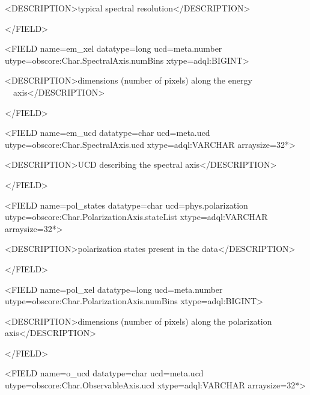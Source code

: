 \documentclass[11pt,a4paper]{ivoa}
\begin{document}
{\textless}DESCRIPTION{\textgreater}typical spectral resolution{\textless}/DESCRIPTION{\textgreater}

{\textless}/FIELD{\textgreater}

{\textless}FIELD name={\textquotedbl}em\_xel{\textquotedbl} datatype={\textquotedbl}long{\textquotedbl}
ucd={\textquotedbl}meta.number{\textquotedbl} utype={\textquotedbl}obscore:Char.SpectralAxis.numBins{\textquotedbl}
xtype={\textquotedbl}adql:BIGINT{\textquotedbl}{\textgreater}

 {\textless}DESCRIPTION{\textgreater}dimensions (number of pixels) along the energy
\ \ axis{\textless}/DESCRIPTION{\textgreater}

{\textless}/FIELD{\textgreater}

{\textless}FIELD name={\textquotedbl}em\_ucd{\textquotedbl} datatype={\textquotedbl}char{\textquotedbl}
ucd={\textquotedbl}meta.ucd{\textquotedbl} utype={\textquotedbl}obscore:Char.SpectralAxis.ucd{\textquotedbl}
xtype={\textquotedbl}adql:VARCHAR{\textquotedbl} arraysize={\textquotedbl}32*{\textquotedbl}{\textgreater}

 {\textless}DESCRIPTION{\textgreater}UCD describing the spectral axis{\textless}/DESCRIPTION{\textgreater}

{\textless}/FIELD{\textgreater}

{\textless}FIELD name={\textquotedbl}pol\_states{\textquotedbl} datatype={\textquotedbl}char{\textquotedbl}
ucd={\textquotedbl}phys.polarization{\textquotedbl}
utype={\textquotedbl}obscore:Char.PolarizationAxis.stateList{\textquotedbl}
xtype={\textquotedbl}adql:VARCHAR{\textquotedbl} arraysize={\textquotedbl}32*{\textquotedbl}{\textgreater}

 {\textless}DESCRIPTION{\textgreater}polarization states present in the data{\textless}/DESCRIPTION{\textgreater}

{\textless}/FIELD{\textgreater}

{\textless}FIELD name={\textquotedbl}pol\_xel{\textquotedbl} datatype={\textquotedbl}long{\textquotedbl}
ucd={\textquotedbl}meta.number{\textquotedbl} utype={\textquotedbl}obscore:Char.PolarizationAxis.numBins{\textquotedbl}
xtype={\textquotedbl}adql:BIGINT{\textquotedbl}{\textgreater}

 {\textless}DESCRIPTION{\textgreater}dimensions (number of pixels) along the polarization
axis{\textless}/DESCRIPTION{\textgreater}

{\textless}/FIELD{\textgreater}

{\textless}FIELD name={\textquotedbl}o\_ucd{\textquotedbl} datatype={\textquotedbl}char{\textquotedbl}
ucd={\textquotedbl}meta.ucd{\textquotedbl} utype={\textquotedbl}obscore:Char.ObservableAxis.ucd{\textquotedbl}
xtype={\textquotedbl}adql:VARCHAR{\textquotedbl} arraysize={\textquotedbl}32*{\textquotedbl}{\textgreater}
\end{document}
